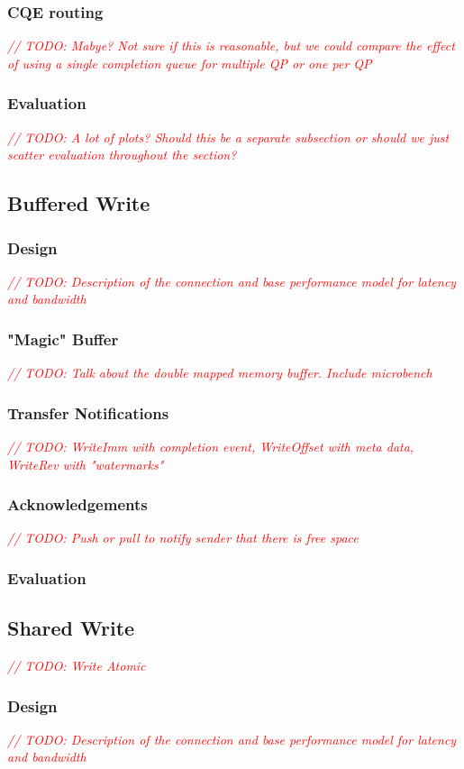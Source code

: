 \documentclass{article}
\newcommand{\todo}[1]{\textit{\textcolor{red}{// TODO: #1} }}
\theoremstyle{plain}
\theoremstyle{definition}
\theoremstyle{remark}
\begin{document}
\subsubsection{CQE routing}
\todo{Mabye? Not sure if this is reasonable, but we could compare the effect of using a single completion queue for multiple QP or one per QP}
\subsubsection{Evaluation}
\todo{A lot of plots? Should this be a separate subsection or should we just scatter evaluation throughout the section?}

\pagebreak
\subsection{Buffered Write}
\subsubsection{Design}
\todo{Description of the connection and base performance model for latency and bandwidth}
\subsubsection{"Magic" Buffer}
\todo{Talk about the double mapped memory buffer. Include microbench}
\subsubsection{Transfer Notifications}
\todo{WriteImm with completion event, WriteOffset with meta data, WriteRev with "watermarks"}
\subsubsection{Acknowledgements}
\todo{Push or pull to notify sender that there is free space}
\subsubsection{Evaluation}


\pagebreak
\subsection{Shared Write}
\todo{Write Atomic}
\subsubsection{Design}
\todo{Description of the connection and base performance model for latency and bandwidth}
\end{document}
